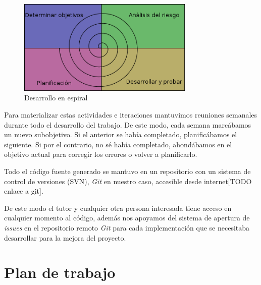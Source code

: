 \begin{figure}[h]
    \centering
    \includegraphics[width=0.75\textwidth]{img/metodologia_espiral}
    \caption{Desarrollo en espiral}
    \label{fig:espira}
\end{figure}

Para materializar estas actividades e iteraciones mantuvimos reuniones semanales durante todo el desarrollo del trabajo. De este modo, cada semana marcábamos un nuevo subobjetivo. Si el anterior se había completado, planificábamos el siguiente. Si por el contrario, no sé había completado, ahondábamos en el objetivo actual para corregir los errores o volver a planificarlo.

Todo el código fuente generado se mantuvo en un repositorio con un sistema de control de versiones (SVN), \textit{Git} en nuestro caso, accesible desde internet[TODO enlace a git].

De este modo el tutor y cualquier otra persona interesada tiene acceso en cualquier momento al código, además nos apoyamos del sistema de apertura de \textit{issues} en el repositorio remoto \textit{Git} para cada implementación que se necesitaba desarrollar para la mejora del proyecto. 

\section{Plan de trabajo}
\label{sec:plan}

